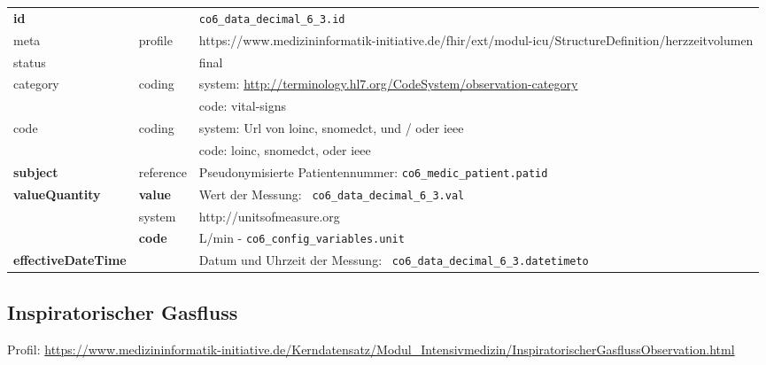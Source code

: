 \begin{longtable}{|l|l|p{7.5cm}|}
        \hline
        \rowcolor{lightgray} \multicolumn{3}{|l|}{Data Mapping (inhaltlich)} \\ \hline
        \textbf{id} &  & \texttt{co6\_data\_decimal\_6\_3.id} \\ \hline
	meta & profile & https://www.medizininformatik-initiative.de/fhir/ext/modul-icu/StructureDefinition/herzzeitvolumen \\ \hline 
	status &  & final   \\ \hline 
	category & coding & system: \url{http://terminology.hl7.org/CodeSystem/observation-category} \\
\cline{3-3}
	& & code: vital-signs \\ \hline
	code & coding & system: Url von \ac{loinc}, \ac{snomedct}, und / oder \ac{ieee} \\ 
	\cline{3-3} 
	 &  & code: \ac{loinc}, \ac{snomedct}, oder \ac{ieee} \\ \hline
	 \textbf{subject}  & reference & Pseudonymisierte Patientennummer: \texttt{co6\_medic\_patient.patid} \\ \hline
	 \textbf{valueQuantity}  & \textbf{value} & Wert der Messung: \texttt{
co6\_data\_decimal\_6\_3.val} \\
        \cline{2-3}
         & system & http://unitsofmeasure.org \\
         \cline{2-3}
         & \textbf{code} &
L/min - \texttt{co6\_config\_variables.unit}
\\ \hline
     \textbf{effectiveDateTime}  & & Datum und Uhrzeit der Messung: \texttt{
co6\_data\_decimal\_6\_3.datetimeto} \\
     \hline
\end{longtable}


\subsection{Inspiratorischer Gasfluss} 

Profil: \url{https://www.medizininformatik-initiative.de/Kerndatensatz/Modul_Intensivmedizin/InspiratorischerGasflussObservation.html}

